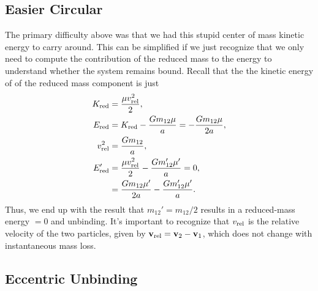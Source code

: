 \documentclass[12pt]{article}
\newcommand*{\bm}[1]{\boldsymbol{\mathbf{#1}}}
\begin{document}
\subsection{Easier Circular}

The primary difficulty above was that we had this stupid center of mass kinetic
energy to carry around. This can be simplified if we just recognize that we only
need to compute the contribution of the reduced mass to the energy to understand
whether the system remains bound. Recall that the the kinetic energy of of the
reduced mass component is just
\begin{align}
    K_{\rm red} &= \frac{\mu v_{\rm rel}^2}{2},\\
    E_{\rm red} &= K_{\rm red} - \frac{Gm_{12}\mu}{a} =
            -\frac{Gm_{12}\mu}{2a},\\
    v_{\rm rel}^2 &= \frac{Gm_{12}}{a},\\
    E_{\rm red}' &= \frac{\mu v_{\rm rel}^2}{2}
        - \frac{Gm_{12}'\mu'}{a} = 0,\\
        &= \frac{Gm_{12}\mu'}{2a} - \frac{Gm_{12}'\mu'}{a}.
\end{align}
Thus, we end up with the result that $m_{12}' = m_{12} / 2$ results in a
reduced-mass energy $= 0$ and unbinding. It's important to recognize that
$v_{\rm rel}$ is the relative velocity of the two particles, given by
$\bm{v}_{\rm rel} = \bm{v}_2 - \bm{v}_1$, which does not change with
instantaneous mass loss.

\subsection{Eccentric Unbinding}
\end{document}
